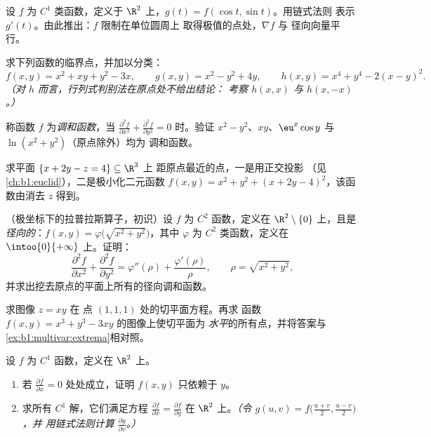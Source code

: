 \begin{exercise}[$\star\star$]\label{exo:b1:multivar:5}
设 $f$ 为 $C^1$ 类函数，定义于 $\R^2$ 上，$g(t) = f(\cos t, \sin t)$。用链式法则
表示 $g'(t)$。由此推出：$f$ 限制在单位圆周上
取得极值的点处，$\nabla f$ 与
径向向量平行。
\end{exercise}

\begin{exercise}[$\star\star$]\label{exo:b1:multivar:6}
求下列函数的临界点，并加以分类：
\[
f(x, y) = x^2 + xy + y^2 - 3x,
\qquad
g(x, y) = x^2 - y^2 + 4y,
\qquad
h(x, y) = x^4 + y^4 - 2(x - y)^2 .
\]
\emph{（对 $h$ 而言，行列式判别法在原点处不给出结论：
考察 $h(x, x)$ 与 $h(x, -x)$。）}
\end{exercise}

\begin{exercise}[$\star\star$]\label{exo:b1:multivar:7}
称函数 $f$ 为\emph{调和函数}，当 $\frac{\partial^2 f}{\partial
x^2} + \frac{\partial^2 f}{\partial y^2} = 0$ 时。验证 $x^2 -
y^2$、$xy$、$\eu^x\cos y$ 与 $\ln(x^2 + y^2)$（原点除外）均为
调和函数。
\end{exercise}

\begin{exercise}[$\star\star\star$]\label{exo:b1:multivar:8}
求平面 $\{x + 2y - z = 4\} \subseteq \R^3$ 上
距原点最近的点，一是用正交投影
（见\cref{ch:b1:euclid}），二是极小化二元函数
$f(x, y) = x^2 + y^2 + (x + 2y - 4)^2$，该函数由消去 $z$ 得到。
\end{exercise}

\begin{exercise}[$\star\star\star$]\label{exo:b1:multivar:9}
（极坐标下的拉普拉斯算子，初识）设 $f$ 为 $C^2$ 函数，定义在
$\R^2 \setminus \{0\}$ 上，且是\emph{径向的}：$f(x, y) =
\varphi\bigl(\sqrt{x^2+y^2}\bigr)$，其中 $\varphi$ 为 $C^2$ 类函数，定义在
$\intoo{0}{+\infty}$ 上。证明：
\[
\frac{\partial^2 f}{\partial x^2} + \frac{\partial^2 f}{\partial
y^2} = \varphi''(\rho) + \frac{\varphi'(\rho)}{\rho},
\qquad \rho = \sqrt{x^2 + y^2},
\]
并求出挖去原点的平面上所有的径向调和函数。
\end{exercise}

\begin{exercise}[$\star\star$]\label{exo:b1:multivar:10}
求图像 $z = xy$ 在
点 $(1, 1, 1)$ 处的切平面方程。再求
函数 $f(x,y) = x^3 + y^3 - 3xy$ 的图像上使切平面为
\emph{水平}的所有点，并将答案与
\cref{ex:b1:multivar:extrema}相对照。
\end{exercise}

\begin{exercise}[$\star\star$]\label{exo:b1:multivar:11}
设 $f$ 为 $C^1$ 函数，定义在 $\R^2$ 上。
\begin{enumerate}
  \item 若 $\frac{\partial f}{\partial x} = 0$ 处处成立，证明
        $f(x, y)$ 只依赖于 $y$。
  \item 求所有 $C^1$ 解，它们满足方程
        $\frac{\partial f}{\partial x} = \frac{\partial
        f}{\partial y}$ 在 $\R^2$ 上。\emph{（令 $g(u, v) =
        f\bigl(\frac{u+v}2, \frac{u-v}2\bigr)$，并
        用链式法则计算 $\frac{\partial g}{\partial v}$。）}
\end{enumerate}
\end{exercise}

